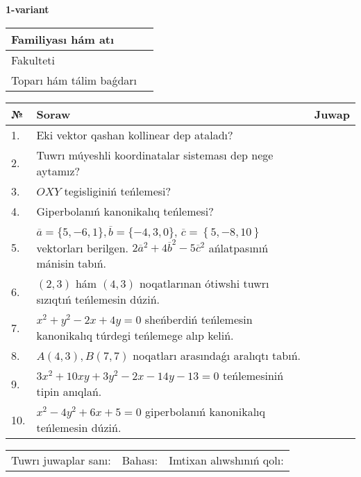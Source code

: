 \documentclass{article}
\begin{document}


\textbf{1-variant}\\

\bgroup
\def\arraystretch{1.6} %

\begin{tabular}{|m{5.7cm}|m{9.5cm}|}
\hline
Familiyası hám atı & \\
\hline
Fakulteti  & \\
\hline
Toparı hám tálim baǵdarı  & \\
\hline
\end{tabular}

\vspace{1cm}

\begin{tabular}{|m{0.7cm}|m{10cm}|m{4cm}|}
\hline
№ & Soraw & Juwap \\
\hline
1. & Eki vektor qashan kollinear dep ataladı? &  \\
\hline
2. & Tuwrı múyeshli koordinatalar sisteması dep nege aytamız? &  \\
\hline
3. & $OXY$ tegisliginiń teńlemesi? &  \\
\hline
4. & Giperbolanıń kanonikalıq teńlemesi? &  \\
\hline
5. & $\overline{a}=\{5,-6, 1 \}, \overline{b}=\{-4, 3, 0 \} $, $\overline{c}=\left\{ 5,-8, 10 \right\}$ vektorları berilgen. $2{\overline{a}}^{2}+4{\overline{b}}^{2}-5{\overline{c}}^{2}$ ańlatpasınıń mánisin tabıń. &  \\
\hline
6. & $(2, 3)$ hám $(4, 3)$ noqatlarınan ótiwshi tuwrı sızıqtıń teńlemesin dúziń. &  \\
\hline
7. & $x^{2}+y^{2}-2x+4y=0$ sheńberdiń teńlemesin kanonikalıq túrdegi teńlemege alıp keliń. &  \\
\hline
8. & $A(4, 3), B(7, 7)$ noqatları arasındaǵı aralıqtı tabıń. &  \\
\hline
9. & $3x^{2}+10xy+3y^{2}-2x-14y-13=0$ teńlemesiniń tipin anıqlań. &  \\
\hline
10. & $x^{2}-4y^{2}+6x+5=0$ giperbolanıń kanonikalıq teńlemesin dúziń. &  \\
\hline
\end{tabular}

\vspace{1cm}

\begin{tabular}{lll}
Tuwrı juwaplar sanı: \underline{\hspace{1.5cm}} & 
Bahası: \underline{\hspace{1.5cm}} & 
Imtixan alıwshınıń qolı: \underline{\hspace{2cm}} \\
\end{tabular}
\end{document}
